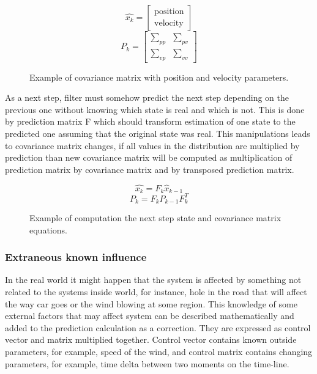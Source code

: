 \documentclass[../../main]{subfiles}
\begin{document}
\begin{figure} [ht!]
  \centering    
    \begin{equation}
       \hat{x_k} = \left[ \begin{array}{c} \text{position} \\ \text{velocity} \end{array} \right]
    \end{equation}
    \begin{equation}
       P_k = \begin{bmatrix} \sum_{pp} & \sum_{pv} \\ \sum_{vp} & \sum_{vv} \end{bmatrix}
    \end{equation}
  \caption{Example of covariance matrix with position and velocity parameters.}
\end{figure}

As a next step, filter must somehow predict the next step depending on the previous one without knowing which state is real and which is not. This is done by prediction matrix F which should transform estimation of one state to the predicted one assuming that the original state was real. This manipulations leads to covariance matrix changes, if all values in the distribution are multiplied by prediction than new covariance matrix will be computed as multiplication of prediction matrix by covariance matrix and by transposed prediction matrix.

\begin{figure} [ht!]
  \centering    
    \begin{equation}
       \hat{x_k} = F_k \hat{x}_{k-1}
    \end{equation}
     \begin{equation}
       P_k = F_k P_{k-1} F_k^T
    \end{equation}
  \caption{Example of computation the next step state and covariance matrix equations.}
\end{figure}

\subsubsection*{Extraneous known influence}

In the real world it might happen that the system is affected by something not related to the systems inside world, for instance, hole in the road that will affect the way car goes or the wind blowing at some region. This knowledge of some external factors that may affect system can be described mathematically and added to the prediction calculation as a correction. They are expressed as control vector and matrix multiplied together. Control vector contains known outside parameters, for example, speed of the wind, and control matrix contains changing parameters, for example, time delta between two moments on the time-line.
\end{document}
